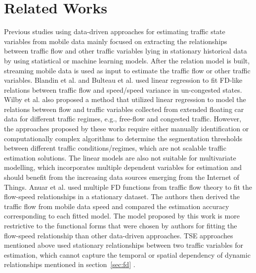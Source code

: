 \documentclass[english]{kththesis}
\begin{document}
\section{Related Works}
\label{sec:relatedWorks}
Previous studies using data-driven approaches for estimating traffic state variables from mobile data mainly focused on extracting the relationships between traffic flow and other traffic variables lying in stationary historical data by using statistical or machine learning models. After the relation model is built, streaming mobile data is used as input to estimate the traffic flow or other traffic variables. Blandin et al. \cite{blandin_individual_speed} and Bulteau et al. \cite{Bulteau_flow_higher-order} used linear regression to fit FD-like relations between traffic flow and speed/speed variance in un-congested states. Wilby et al. \cite{wilby_flow_estimation_xfcd} also proposed a method that utilized linear regression to model the relations between flow and traffic variables collected from extended floating car data for different traffic regimes, e.g., free-flow and congested traffic. However, the approaches proposed by these works require either manually identification or computationally complex algorithms to determine the segmentation thresholds between different traffic conditions/regimes, which are not scalable traffic estimation solutions. The linear models are also not suitable for multivariate modelling, which incorporates multiple dependent variables for estimation and should benefit from the increasing data sources emerging from the Internet of Things. Anuar et al. \cite{anuar_flow_probe} used multiple FD functions from traffic flow theory to fit the flow-speed relationships in a stationary dataset. The authors then derived the traffic flow from mobile data speed and compared the estimation accuracy corresponding to each fitted model. The model proposed by this work is more restrictive to the functional forms that were chosen by authors for fitting the flow-speed relationship than other data-driven approaches. TSE approaches mentioned above used stationary relationships between two traffic variables for estimation, which cannot capture the temporal or spatial dependency of dynamic relationships mentioned in section~\ref{sec:fd} .
\end{document}

